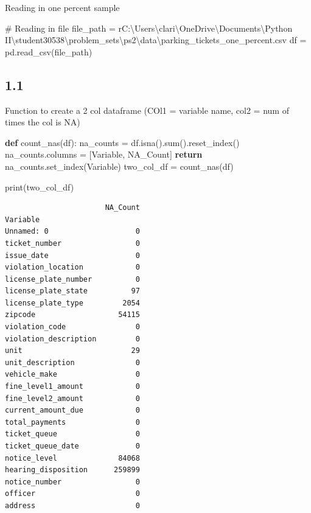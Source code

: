 \documentclass[
  letterpaper,
  DIV=11,
  numbers=noendperiod]{scrartcl}
\newenvironment{Shaded}{\begin{snugshade}}{\end{snugshade}}
\newcommand{\BuiltInTok}[1]{\textcolor[rgb]{0.00,0.23,0.31}{#1}}
\newcommand{\CommentTok}[1]{\textcolor[rgb]{0.37,0.37,0.37}{#1}}
\newcommand{\ControlFlowTok}[1]{\textcolor[rgb]{0.00,0.23,0.31}{\textbf{#1}}}
\newcommand{\KeywordTok}[1]{\textcolor[rgb]{0.00,0.23,0.31}{\textbf{#1}}}
\newcommand{\NormalTok}[1]{\textcolor[rgb]{0.00,0.23,0.31}{#1}}
\newcommand{\OperatorTok}[1]{\textcolor[rgb]{0.37,0.37,0.37}{#1}}
\newcommand{\StringTok}[1]{\textcolor[rgb]{0.13,0.47,0.30}{#1}}
\newcommand{\VerbatimStringTok}[1]{\textcolor[rgb]{0.13,0.47,0.30}{#1}}
\begin{document}
Reading in one percent sample

\begin{Shaded}
\begin{Highlighting}[]
\CommentTok{\# Reading in file}
\NormalTok{file\_path }\OperatorTok{=} \VerbatimStringTok{r\textquotesingle{}C:\textbackslash{}Users\textbackslash{}clari\textbackslash{}OneDrive\textbackslash{}Documents\textbackslash{}Python II\textbackslash{}student30538\textbackslash{}problem\_sets\textbackslash{}ps2\textbackslash{}data\textbackslash{}parking\_tickets\_one\_percent.csv\textquotesingle{}}
\NormalTok{df }\OperatorTok{=}\NormalTok{ pd.read\_csv(file\_path)}
\end{Highlighting}
\end{Shaded}

\subsection{1.1}\label{section}

Function to create a 2 col dataframe (COl1 = variable name, col2 = num
of times the col is NA)

\begin{Shaded}
\begin{Highlighting}[]
\KeywordTok{def}\NormalTok{ count\_nas(df):}
\NormalTok{    na\_counts }\OperatorTok{=}\NormalTok{ df.isna().}\BuiltInTok{sum}\NormalTok{().reset\_index()}
\NormalTok{    na\_counts.columns }\OperatorTok{=}\NormalTok{ [}\StringTok{\textquotesingle{}Variable\textquotesingle{}}\NormalTok{, }\StringTok{\textquotesingle{}NA\_Count\textquotesingle{}}\NormalTok{]}
    \ControlFlowTok{return}\NormalTok{ na\_counts.set\_index(}\StringTok{\textquotesingle{}Variable\textquotesingle{}}\NormalTok{)}
\NormalTok{two\_col\_df }\OperatorTok{=}\NormalTok{ count\_nas(df)}

\BuiltInTok{print}\NormalTok{(two\_col\_df)}
\end{Highlighting}
\end{Shaded}

\begin{verbatim}
                       NA_Count
Variable                       
Unnamed: 0                    0
ticket_number                 0
issue_date                    0
violation_location            0
license_plate_number          0
license_plate_state          97
license_plate_type         2054
zipcode                   54115
violation_code                0
violation_description         0
unit                         29
unit_description              0
vehicle_make                  0
fine_level1_amount            0
fine_level2_amount            0
current_amount_due            0
total_payments                0
ticket_queue                  0
ticket_queue_date             0
notice_level              84068
hearing_disposition      259899
notice_number                 0
officer                       0
address                       0
\end{verbatim}
\end{document}
